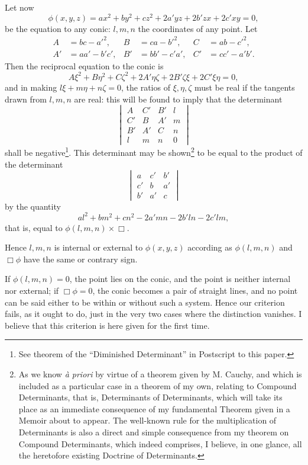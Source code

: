 \documentclass[11pt]{article}
\newcommand{\sourcepage}[1]{\marginpar{\scriptsize p.~#1}}
\begin{document}
{{\sourcepage{126}
Let now
\[
\phi(x,y,z)=ax^2+by^2+cz^2+2a'yz+2b'zx+2c'xy=0,
\]
be the equation to any conic: $l,m,n$ the coordinates of any point. Let
\[
\begin{aligned}
A&=bc-a'^2,& B&=ca-b'^2,& C&=ab-c'^2,\\
A'&=aa'-b'c',& B'&=bb'-c'a',& C'&=cc'-a'b'.
\end{aligned}
\]
Then the reciprocal equation to the conic is
\[
A\xi^2+B\eta^2+C\zeta^2+2A'\eta\zeta+2B'\zeta\xi+2C'\xi\eta=0,
\]
and in making $l\xi+m\eta+n\zeta=0$, the ratios of $\xi,\eta,\zeta$ must be real if the tangents drawn from $l,m,n$ are real: this will be found to imply that the determinant
\[
\begin{vmatrix}
A&C'&B'&l\\
C'&B&A'&m\\
B'&A'&C&n\\
l&m&n&0
\end{vmatrix}
\]
shall be negative\footnote{See theorem of the ``Diminished Determinant'' in Postscript to this paper.}. This determinant may be shown\footnote{As we know \emph{\`a priori} by virtue of a theorem given by M. Cauchy, and which is included as a particular case in a theorem of my own, relating to Compound Determinants, that is, Determinants of Determinants, which will take its place as an immediate consequence of my fundamental Theorem given in a Memoir about to appear. The well-known rule for the multiplication of Determinants is also a direct and simple consequence from my theorem on Compound Determinants, which indeed comprises, I believe, in one glance, all the heretofore existing Doctrine of Determinants.} to be equal to the product of the determinant
\[
\begin{vmatrix}
a&c'&b'\\
c'&b&a'\\
b'&a'&c
\end{vmatrix}
\]
by the quantity
\[
al^2+bm^2+cn^2-2a'mn-2b'ln-2c'lm,
\]
that is, equal to $\phi(l,m,n)\times\Box$.

Hence $l,m,n$ is internal or external to $\phi(x,y,z)$ according as $\phi(l,m,n)$ and $\Box\phi$ have the same or contrary sign.

If $\phi(l,m,n)=0$, the point lies on the conic, and the point is neither internal nor external; if $\Box\phi=0$, the conic becomes a pair of straight lines, and no point can be said either to be within or without such a system. Hence our criterion fails, as it ought to do, just in the very two cases where the distinction vanishes. I believe that this criterion is here given for the first time.

}}
\end{document}
